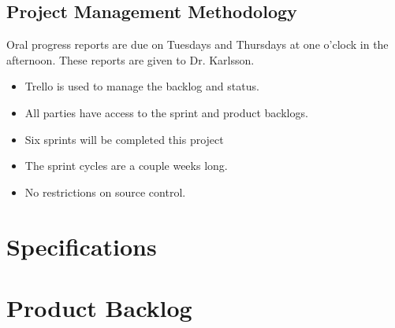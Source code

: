 \subsection{Project  Management Methodology}

Oral progress reports are due on Tuesdays and Thursdays at one o'clock in the 
afternoon. These reports are given to Dr. Karlsson. 
 
\begin{itemize}
\item Trello is used to manage the backlog and status.
\item All parties have access to the sprint and product backlogs.
\item Six sprints will be completed this project
\item The sprint cycles are a couple weeks long.
\item No restrictions on source control.
\end{itemize}


\section{Specifications}

\section{Product Backlog}

 


